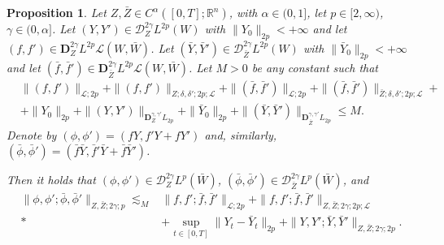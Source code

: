 \documentclass[11pt,a4paper]{article}
\newcommand{\R}{\mathbb{R}}
\theoremstyle{plain}
\newtheorem{prop}[defn]{Proposition}
\begin{document}
\begin{prop} \label{prop:stabilityundercomposition}
Let $Z,\bar{Z} \in C^\alpha([0,T];\R^n)$, with $\alpha \in (0,1]$, let $p \in [2,\infty)$, $\gamma \in (0,\alpha]$. \linebreak
Let $(Y,Y') \in \mathscr{D}_Z^{2\gamma}L^{2p}(W)$ with $\|Y_0\|_{2p} <+\infty$ and let $(f,f') \in \mathbf{D}_Z^{2\gamma}L^{2p}\mathscr{L}(W,\bar W)$.
Let $(\bar{Y},\bar{Y}') \in \mathscr{D}_{\bar{Z}}^{2\gamma}L^{2p}(W)$ with $\|\bar{Y}_0\|_{2p} <+\infty$ and let $(\bar{f},\bar{f}') \in \mathbf{D}_{\bar{Z}}^{2\gamma}L^{2p}\mathscr{L}(W,\bar W)$.
Let $M>0$ be any constant such that \begin{equation*}
    \begin{aligned}
        &\| (f,f') \|_{\mathscr{L};2p} + \| (f,f') \|_{Z;\delta,\delta';2p;\mathscr{L}} + \| (\bar{f},\bar{f}') \|_{\mathscr{L};2p} + \| (\bar{f},\bar{f}') \|_{\bar{Z};\delta,\delta';2p;\mathscr{L}} + \\
        &+ \|Y_0\|_{2p} + \|(Y,Y')\|_{\mathbf{D}_Z^{\gamma,\gamma'}L_{2p}} + \|\bar{Y}_0\|_{2p} +\|(\bar{Y},\bar{Y}')\|_{\mathbf{D}_{\bar{Z}}^{\gamma,\gamma'}L_{2p}} \le M.
    \end{aligned}
\end{equation*}
Denote by $(\phi,\phi')=(fY,f'Y+fY')$ and, similarly, $(\bar{\phi},\bar{\phi}')=(\bar{f}\bar{Y},\bar{f}'\bar{Y}+\bar{f}\bar{Y}')$.

\noindent Then it holds that $(\phi,\phi') \in \mathscr{D}_Z^{2\gamma}L^p(\bar W)$, $ (\bar{\phi},\bar{\phi}') \in \mathscr{D}_{\bar{Z}}^{2\gamma}L^p(\bar W)$, and
\begin{align*}
        \|\phi,\phi';\bar{\phi},\bar{\phi}'\|_{Z,\bar{Z};2\gamma;p} \lesssim_M &  \| f,f';\bar{f},\bar{f}' \|_{\mathscr{L};2p} + \| f,f';\bar{f},\bar{f}' \|_{Z,\bar{Z};2\gamma;2p;\mathscr{L}} \\*
        & + \sup_{t \in [0,T]} \|Y_t - \bar Y_t\|_{2p} + 
        \|Y,Y';\bar{Y},\bar{Y}'\|_{Z,\bar{Z};2\gamma;2p}.
    \end{align*}
\end{prop}
\end{document}
